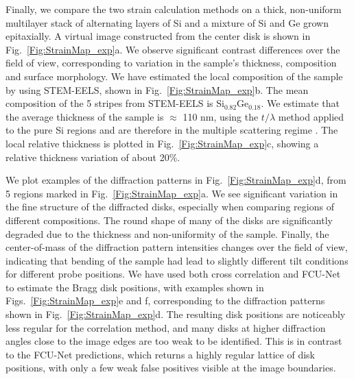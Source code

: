 \documentclass[%
 reprint,
superscriptaddress,
 amsmath,
 amssymb,
 prl,
]{revtex4-2}
\begin{document}
Finally, we compare the two strain calculation methods on a thick, non-uniform multilayer stack of alternating layers of Si and a mixture of Si and Ge grown epitaxially. A virtual image constructed from the center disk is shown in Fig.~\ref{Fig:StrainMap_exp}a. We observe significant contrast differences over the field of view, corresponding to variation in the sample's thickness, composition and surface morphology. We have estimated the local composition of the sample by using STEM-EELS, shown in Fig.~\ref{Fig:StrainMap_exp}b. The mean composition of the 5 stripes from STEM-EELS is Si$_{0.82}$Ge$_{0.18}$. We estimate that the average thickness of the sample is $\approx$ 110 nm, using the $t/\lambda$ method \cite{malis1988eels} applied to the pure Si regions and are therefore in the multiple scattering regime \cite{vallejo2018observation}. The local relative thickness is plotted in Fig.~\ref{Fig:StrainMap_exp}c, showing a relative thickness variation of about 20\%.

We plot examples of the diffraction patterns in Fig.~\ref{Fig:StrainMap_exp}d, from 5 regions marked in Fig.~\ref{Fig:StrainMap_exp}a. We see significant variation in the fine structure of the diffracted disks, especially when comparing regions of different compositions. The round shape of many of the disks are significantly degraded due to the thickness and non-uniformity of the sample. Finally, the center-of-mass of the diffraction pattern intensities changes over the field of view, indicating that bending of the sample had lead to slightly different tilt conditions for different probe positions. We have used both cross correlation and FCU-Net to estimate the Bragg disk positions, with examples shown in Figs.~\ref{Fig:StrainMap_exp}e and f, corresponding to the diffraction patterns shown in  Fig.~\ref{Fig:StrainMap_exp}d. The resulting disk positions are noticeably less regular for the correlation method, and many disks at higher diffraction angles close to the image edges are too weak to be identified. This is in contrast to the FCU-Net predictions, which returns a highly regular lattice of disk positions, with only a few weak false positives visible at the image boundaries.
\end{document}
